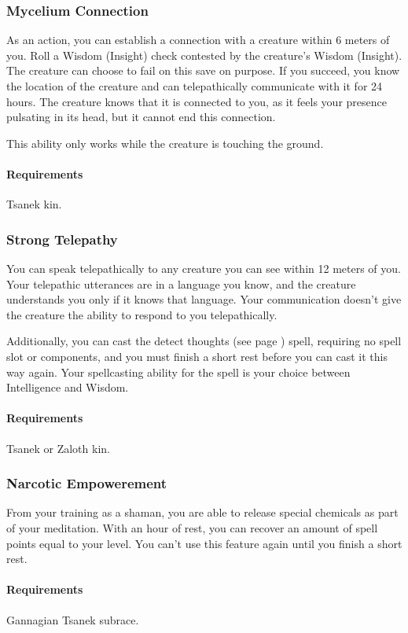     \subsubsection{Mycelium Connection} \label{feat::myceliumconnection}
        As an action, you can establish a connection with a creature within 6 meters of you.
        Roll a Wisdom (Insight) check contested by the creature's Wisdom (Insight).
        The creature can choose to fail on this save on purpose.
        If you succeed, you know the location of the creature and can telepathically communicate with it for 24 hours.
        The creature knows that it is connected to you, as it feels your presence pulsating in its head, but it cannot end this connection.

        This ability only works while the creature is touching the ground.
        \paragraph{Requirements} Tsanek kin.
    \subsubsection{Strong Telepathy} \label{feat::strongtelepathy}
        You can speak telepathically to any creature you can see within 12 meters of you.
        Your telepathic utterances are in a language you know, and the creature understands you only if it knows that language.
        Your communication doesn't give the creature the ability to respond to you telepathically.

        Additionally, you can cast the detect thoughts (see page \pageref{spell::detectthoughts}) spell, requiring no spell slot or components, and you must finish a short rest before you can cast it this way again.
        Your spellcasting ability for the spell is your choice between Intelligence and Wisdom.
        \paragraph{Requirements} Tsanek or Zaloth kin.
    \subsubsection{Narcotic Empowerement} \label{feat::narcoticempowerement}
        From your training as a shaman, you are able to release special chemicals as part of your meditation.
        With an hour of rest, you can recover an amount of spell points equal to your level.
        You can't use this feature again until you finish a short rest.
        \paragraph{Requirements} Gannagian Tsanek subrace.

\newpage~\newpage
